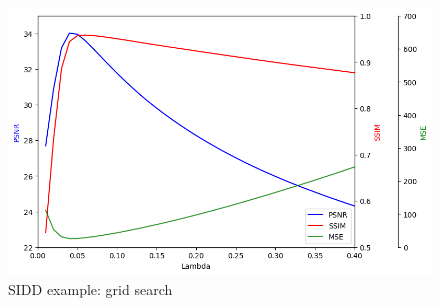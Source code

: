 \documentclass[12pt]{article}
\begin{document}
\begin{figure}[h]
    \centering
    \includegraphics[width=0.8\linewidth]{100-line_plots.png}
    \caption{SIDD example: grid search}
    \label{fig:enter-label}
\end{figure}
\end{document}
